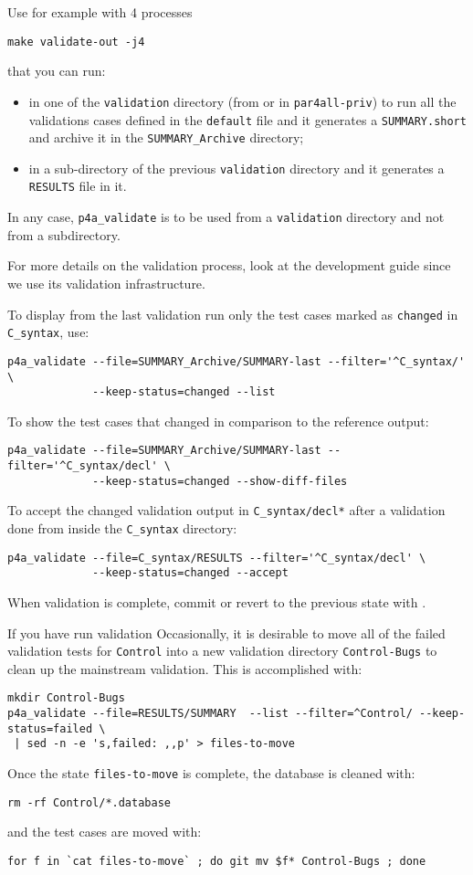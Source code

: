 \documentclass[a4paper]{article}
\begin{document}
Use for example with 4 processes
\begin{verbatim}
make validate-out -j4
\end{verbatim}
that you can run:
\begin{itemize}
\item in one of the \texttt{validation} directory (from \Apips or in
  \texttt{par4all-priv}) to run all the validations cases defined in the
  \texttt{default} file and it generates a \texttt{SUMMARY.short} and
  archive it in the \verb|SUMMARY_Archive| directory;
\item in a sub-directory of the previous \texttt{validation} directory and
  it generates a \texttt{RESULTS} file in it.
\end{itemize}
In any case, \verb|p4a_validate| is to be used from a \texttt{validation}
directory and not from a subdirectory.

For more details on the validation process, look at the \Apips development
guide since we use its validation infrastructure.

To display from the last validation run only the test cases marked as
\texttt{changed} in \verb|C_syntax|, use:
\begin{verbatim}
p4a_validate --file=SUMMARY_Archive/SUMMARY-last --filter='^C_syntax/' \
             --keep-status=changed --list
\end{verbatim}

To show the test cases that changed in comparison to the reference output:
\begin{verbatim}
p4a_validate --file=SUMMARY_Archive/SUMMARY-last --filter='^C_syntax/decl' \
             --keep-status=changed --show-diff-files
\end{verbatim}

To accept the changed validation output in \texttt{C\_syntax/decl\emph{*}}
after a validation done from inside the \verb|C_syntax| directory:
\begin{verbatim}
p4a_validate --file=C_syntax/RESULTS --filter='^C_syntax/decl' \
             --keep-status=changed --accept
\end{verbatim}
When validation is complete, commit or revert to the previous state with \Agit.

If you have run validation
Occasionally, it is desirable to move all of the failed validation tests for
\texttt{Control} into a new validation directory \texttt{Control-Bugs} to
clean up the mainstream validation. This is accomplished with:
\begin{verbatim}
mkdir Control-Bugs
p4a_validate --file=RESULTS/SUMMARY  --list --filter=^Control/ --keep-status=failed \
 | sed -n -e 's,failed: ,,p' > files-to-move
\end{verbatim}
Once the state \texttt{files-to-move} is complete, the database is
cleaned with:
\begin{verbatim}
rm -rf Control/*.database
\end{verbatim}
and the test cases are moved with:
\begin{verbatim}
for f in `cat files-to-move` ; do git mv $f* Control-Bugs ; done
\end{verbatim}
\end{document}
